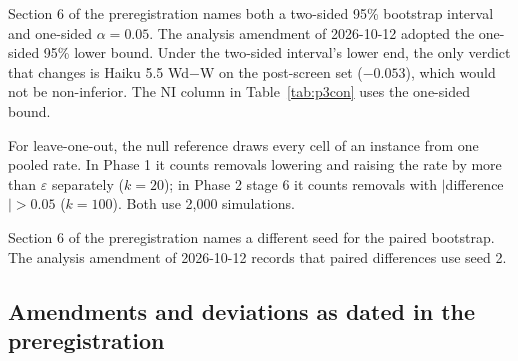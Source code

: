 \documentclass[10pt]{article}
\newcommand{\eps}{\varepsilon}
\begin{document}
Section 6 of the preregistration names both a two-sided 95\% bootstrap interval and one-sided $\alpha=0.05$. The analysis amendment of 2026-10-12 adopted the one-sided 95\% lower bound. Under the two-sided interval's lower end, the only verdict that changes is Haiku 5.5 Wd$-$W on the post-screen set ($-0.053$), which would not be non-inferior. The NI column in Table~\ref{tab:p3con} uses the one-sided bound.

For leave-one-out, the null reference draws every cell of an instance from one pooled rate. In Phase 1 it counts removals lowering and raising the rate by more than $\eps$ separately ($k=20$); in Phase 2 stage 6 it counts removals with $|$difference$| > 0.05$ ($k=100$). Both use 2,000 simulations.

Section 6 of the preregistration names a different seed for the paired bootstrap. The analysis amendment of 2026-10-12 records that paired differences use seed 2.

\subsection{Amendments and deviations as dated in the preregistration}
\end{document}

